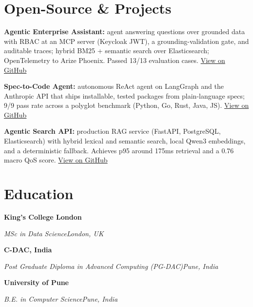 \documentclass[10pt,a4paper]{article}
\newcommand{\entry}[4]{%
  {\color{company}\bfseries #1}\hfill {\color{muted}#2}\par
  \vspace{1pt}
  {\itshape #3}\hfill {\color{muted}\itshape #4}\par
  \vspace{3pt}%
}
\begin{document}
\section{Open-Source \& Projects}
\begin{tight}
  \item \textbf{Agentic Enterprise Assistant:} agent answering questions over grounded data with RBAC at an MCP server (Keycloak JWT), a grounding-validation gate, and auditable traces; hybrid BM25 + semantic search over Elasticsearch; OpenTelemetry to Arize Phoenix. Passed 13/13 evaluation cases. \href{https://github.com/abhijeetscode/Agentic-Enterprise-Assistant}{View on GitHub}
  \item \textbf{Spec-to-Code Agent:} autonomous ReAct agent on LangGraph and the Anthropic API that ships installable, tested packages from plain-language specs; 9/9 pass rate across a polyglot benchmark (Python, Go, Rust, Java, JS). \href{https://github.com/abhijeetscode/Spec-to-Code-Agent}{View on GitHub}
  \item \textbf{Agentic Search API:} production RAG service (FastAPI, PostgreSQL, Elasticsearch) with hybrid lexical and semantic search, local Qwen3 embeddings, and a deterministic fallback. Achieves p95 around 175ms retrieval and a 0.76 macro QoS score. \href{https://github.com/abhijeetscode/search-agent}{View on GitHub}
\end{tight}

\section{Education}
\entry{King's College London}{}{MSc in Data Science}{London, UK}
\vspace{-3pt}
\entry{C-DAC, India}{}{Post Graduate Diploma in Advanced Computing (PG-DAC)}{Pune, India}
\vspace{-3pt}
\entry{University of Pune}{}{B.E. in Computer Science}{Pune, India}
\end{document}

